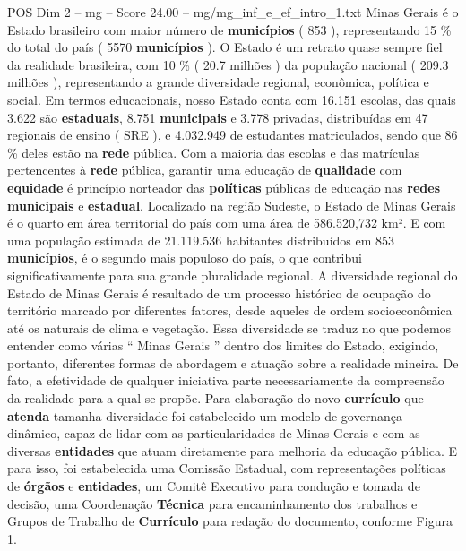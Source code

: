\begin{textsample}{POS Dim 2 – mg – Score 24.00 – mg/mg\_inf\_e\_ef\_intro\_1.txt}
Minas Gerais é o Estado brasileiro com maior número de \textbf{municípios} ( 853 ), representando 15 \% do total do país ( 5570 \textbf{municípios} ).
O Estado é um retrato quase sempre fiel da realidade brasileira, com 10 \% ( 20.7 milhões ) da população nacional ( 209.3 milhões ), representando a grande diversidade regional, econômica, política e social.
Em termos educacionais, nosso Estado conta com 16.151 escolas, das quais 3.622 são \textbf{estaduais}, 8.751 \textbf{municipais} e 3.778 privadas, distribuídas em 47 regionais de ensino ( SRE ), e 4.032.949 de estudantes matriculados, sendo que 86 \% deles estão na \textbf{rede} pública.
Com a maioria das escolas e das matrículas pertencentes à \textbf{rede} pública, garantir uma educação de \textbf{qualidade} com \textbf{equidade} é princípio norteador das \textbf{políticas} públicas de educação nas \textbf{redes} \textbf{municipais} e \textbf{estadual}.
Localizado na região Sudeste, o Estado de Minas Gerais é o quarto em área territorial do país com uma área de 586.520,732 km².
E com uma população estimada de 21.119.536 habitantes distribuídos em 853 \textbf{municípios}, é o segundo mais populoso do país, o que contribui significativamente para sua grande pluralidade regional.
A diversidade regional do Estado de Minas Gerais é resultado de um processo histórico de ocupação do território marcado por diferentes fatores, desde aqueles de ordem socioeconômica até os naturais de clima e vegetação.
Essa diversidade se traduz no que podemos entender como várias “ Minas Gerais ” dentro dos limites do Estado, exigindo, portanto, diferentes formas de abordagem e atuação sobre a realidade mineira.
De fato, a efetividade de qualquer iniciativa parte necessariamente da compreensão da realidade para a qual se propõe.
Para elaboração do novo \textbf{currículo} que \textbf{atenda} tamanha diversidade foi estabelecido um modelo de governança dinâmico, capaz de lidar com as particularidades de Minas Gerais e com as diversas \textbf{entidades} que atuam diretamente para melhoria da educação pública.
E para isso, foi estabelecida uma Comissão Estadual, com representações políticas de \textbf{órgãos} e \textbf{entidades}, um Comitê Executivo para condução e tomada de decisão, uma Coordenação \textbf{Técnica} para encaminhamento dos trabalhos e Grupos de Trabalho de \textbf{Currículo} para redação do documento, conforme Figura 1.

\end{textsample}
